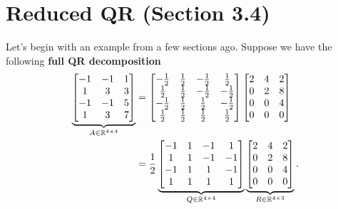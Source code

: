 \documentclass[letterpaper]{article}
\newcommand{\0}{\mathbf{0}}
\begin{document}
\section{Reduced QR (Section 3.4)}
Let's begin with an example from a few sections ago. Suppose we have the following \textbf{full QR decomposition}
\begin{equation*}
    \begin{aligned}
        \underbrace{\begin{bmatrix}
            -1 & -1 & 1 \\ 
            1 & 3 & 3 \\ 
            -1 & -1 & 5 \\ 
            1 & 3 & 7
        \end{bmatrix}}_{A \in \mathbb{R}^{4 \times 4}} &= \begin{bmatrix}
            -\frac{1}{2} & \frac{1}{2} & -\frac{1}{2} & \frac{1}{2} \\ 
            \frac{1}{2} & \frac{1}{2} & -\frac{1}{2} & -\frac{1}{2} \\ 
            -\frac{1}{2} & \frac{1}{2} & \frac{1}{2} & -\frac{1}{2} \\ 
            \frac{1}{2} & \frac{1}{2} & \frac{1}{2} & \frac{1}{2}
        \end{bmatrix} \begin{bmatrix}
            2 & 4 & 2 \\ 
            0 & 2 & 8 \\ 
            0 & 0 & 4 \\ 
            0 & 0 & 0
        \end{bmatrix} \\ 
            &= \frac{1}{2} \underbrace{\begin{bmatrix}
                -1 & 1 & -1 & 1 \\ 
                1 & 1 & -1 & -1 \\ 
                -1 & 1 & 1 & -1 \\ 
                1 & 1 & 1 & 1
            \end{bmatrix}}_{Q \in \mathbb{R}^{4 \times 4}} \underbrace{\begin{bmatrix}
                2 & 4 & 2 \\ 
                0 & 2 & 8 \\ 
                0 & 0 & 4 \\ 
                0 & 0 & 0
            \end{bmatrix}}_{R \in \mathbb{R}^{4 \times 3}}.
    \end{aligned}
\end{equation*}
\end{document}
